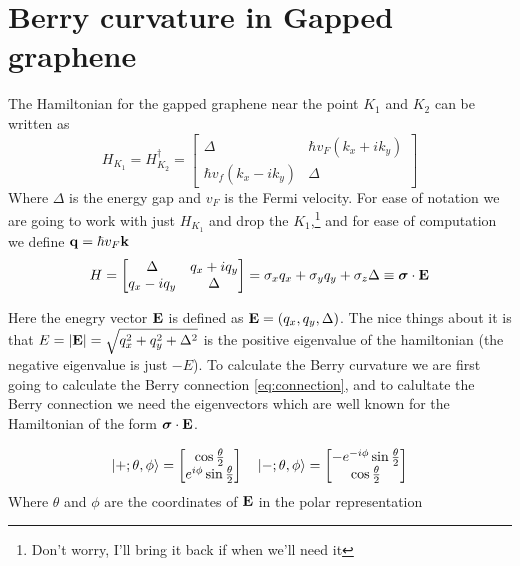\section{Berry curvature in Gapped graphene}

The Hamiltonian for the gapped graphene near the point $K_1$ and $K_2$ can be written as 
\begin{equation}
    H_{K_1}=H_{K_2}^\dagger=
    \begin{bmatrix}
        \Delta & \hbar v_F(k_x+ik_y)\\
        \hbar v_f(k_x-ik_y)& \Delta
    \end{bmatrix}
\end{equation}
Where $\Delta$ is the energy gap and $v_F$ is the Fermi velocity. For ease of notation we are going to work with just $H_{K_1}$ and drop the $K_1$,\footnote{Don't worry, I'll bring it back if when we'll need it} and for ease of computation we define $\mathbf{q}=\hbar v_F\mathbf{k}$
\begin{equation}
    H=
    \begin{bmatrix}
        \Delta & q_x+iq_y\\
        q_x-iq_y& \Delta
    \end{bmatrix}=
    \sigma_x q_x + \sigma_y q_y + \sigma_z \Delta \equiv  \boldsymbol \sigma \cdot \mathbf{E}
\end{equation}

Here the enegry vector $\mathbf{E}$ is defined as $\mathbf{E} =( q_x,q_y,\Delta)$. The nice things about it is that $E=|\mathbf{E}|=\sqrt{q_x^2+q_y^2+\Delta^2}$ is the positive eigenvalue of the hamiltonian (the negative eigenvalue is just $-E$).\newline
To calculate the Berry curvature we are first going to calculate the Berry connection \ref{eq:connection}, and to calultate the Berry connection we need the eigenvectors which are well known for the Hamiltonian of the form $\boldsymbol \sigma \cdot \mathbf{E}$.

\begin{equation}
    \ket{+;\theta,\phi}=
    \begin{bmatrix}
        \cos{\frac \theta 2}\\
        e^{i\phi}\sin{\frac \theta 2}
    \end{bmatrix}
    \quad
    \ket{-;\theta,\phi}=
    \begin{bmatrix}
        -e^{-i\phi}\sin{\frac \theta 2}\\
        \cos{\frac \theta 2}
    \end{bmatrix}
\end{equation}
Where $\theta$ and $\phi$ are the coordinates of $\mathbf{E}$ in the polar representation

